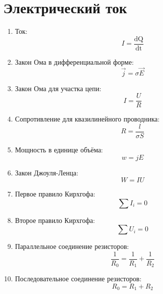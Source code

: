 	\section{Электрический ток}
		\begin{enumerate}
			\item Ток: \[ I = \frac{\mathrm{dQ}}{\mathrm{dt}} \]
			\item Закон Ома в дифференциальной форме: \[ \overrightarrow{j} = \sigma \overrightarrow{E} \]
			\item Закон Ома для участка цепи: \[ I = \frac{U}{R} \]
			\item Сопротивление для квазилинейного проводника: \[ R = \frac{l}{\sigma S} \]
			\item Мощность в единице объёма: \[ w = jE \]
			\item Закон Джоуля-Ленца: \[ W = IU \]
			\item Первое правило Кирхгофа: \[ \sum I_i = 0 \]
			\item Второе правило Кирхгофа: \[ \sum U_i = 0 \]
			\item Параллельное соединение резисторов: \[ \frac{1}{R_0} = \frac{1}{R_1} + \frac{1}{R_2} \]
			\item Последовательное соединение резисторов: \[ R_0 = R_1 + R_2 \]
		\end{enumerate}
		

